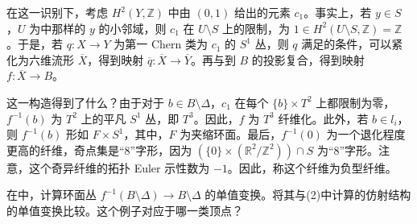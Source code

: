 \begin{construction}
在这一识别下，考虑 $H^2(Y,\mathbb Z)$ 中由 $(0,1)$ 给出的元素 $c_1$。事实上，若 $y\in S$，$U$ 为中那样的 $y$ 的小邻域，则 $c_1$ 在 $U\setminus S$ 上的限制，为 $1\in H^2(U\setminus S,\mathbb Z)=\mathbb Z$。于是，若 $q\colon X\to Y$ 为第一 Chern 类为 $c_1$ 的 $S^1$ 丛，则 $q$ 满足的条件，可以紧化为六维流形 $\overline X$，得到映射 $\overline q\colon\overline X\to\overline Y$。再与到 $B$ 的投影复合，得到映射 $f\colon\overline X\to B$。

这一构造得到了什么？由于对于 $b\in B\setminus\Delta$，$c_1$ 在每个 $\{b\}\times T^2$ 上都限制为零，$f^{-1}(b)$ 为 $T^2$ 上的平凡 $S^1$ 丛，即 $T^3$。因此，$f$ 为 $T^3$ 纤维化。此外，若 $b\in l_i$，则 $f^{-1}(b)$ 形如 $F\times S^1$，其中，$F$ 为夹缩环面。最后，$f^{-1}(0)$ 为一个退化程度更高的纤维，奇点集是“8”字形，因为 $(\{0\}\times(\mathbb R^2/\mathbb Z^2))\cap S$ 为“8”字形。注意，这个奇异纤维的拓扑 Euler 示性数为 $-1$。因此，称这个纤维为负型纤维。
\end{construction}

\begin{exercise}\label{exer:6.91}
在中，计算环面丛 $f^{-1}(B\setminus\Delta)\to B\setminus\Delta$ 的单值变换。将其与(2)中计算的仿射结构的单值变换比较。这个例子对应于哪一类顶点？
\end{exercise}

